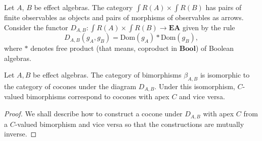 \documentclass[smallextended]{svjour3}
\begin{document}
Let $A$, $B$ be effect algebras. The category ${\int R({A})}\times{\int R({B})}$ has pairs of finite
observables as objects and pairs of morphisms of observables as arrows. Consider the functor
$D_{A,B}:{\int R({A})}\times{\int R({B})}\to{\mathbf{EA}}$ given by the rule
$$
D_{A,B}(g_A,g_B)={\mathrm{Dom}}(g_A)*{\mathrm{Dom}}(g_B),
$$
where $*$ denotes free product (that means, coproduct in ${\mathbf{Bool}}$) of Boolean algebras.

\begin{lemma}
Let $A,B$ be effect algebras.
\label{lemma:tensors:colimits}
The category of bimorphisms $\beta_{A,B}$ is isomorphic to the category of cocones under the diagram $D_{A,B}$.
Under this isomorphism, $C$-valued bimorphisms correspond to cocones with apex $C$ and vice versa. 
\end{lemma}
\begin{proof}
We shall describe how to construct a cocone under $D_{A,B}$ with apex $C$ from a $C$-valued bimorphism
and vice versa so that the constructions are mutually inverse.


\end{proof}
\end{document}

